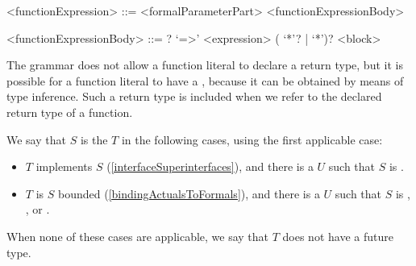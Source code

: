 \documentclass[makeidx]{article}
\begin{document}
{%
\begin{grammar}
<functionExpression> ::= <formalParameterPart> <functionExpressionBody>

<functionExpressionBody> ::= \ASYNC? `=>' <expression>
  \alt (\ASYNC{} `*'? | \SYNC{} `*')? <block>
\end{grammar}

\LMHash{}%
The grammar does not allow a function literal to declare a return type,
but it is possible for a function literal to have a
,
because it can be obtained by means of type inference.
Such a return type is included
when we refer to the declared return type of a function.


\LMHash{}%
We say that $S$ is the
$T$ in the following cases, using the first applicable case:

\begin{itemize}
\item $T$ implements $S$
  (\ref{interfaceSuperinterfaces}),
  and there is a $U$ such that $S$ is .
\item $T$ is $S$ bounded
  (\ref{bindingActualsToFormals}),
  and there is a $U$ such that
  $S$ is , , or .
\end{itemize}

\LMHash{}%
When none of these cases are applicable,
we say that $T$ does not have a future type.


}
\end{document}
